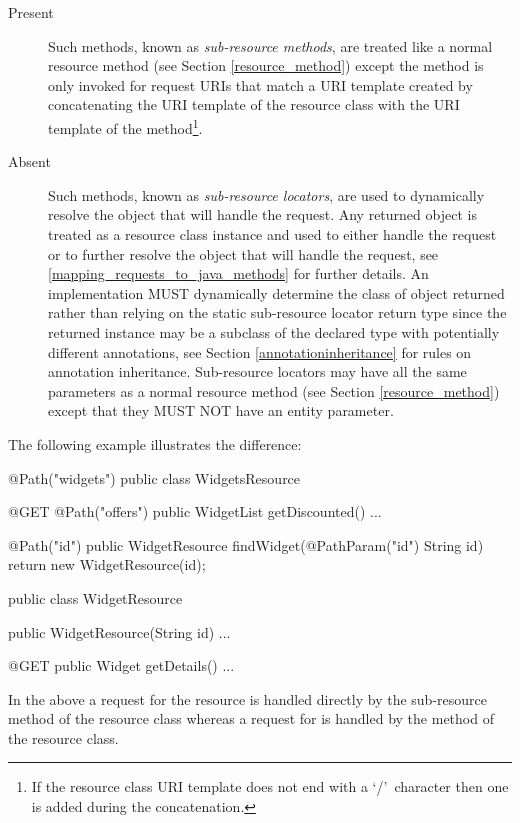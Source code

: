 \begin{description}
\item[Present] Such methods, known as {\em sub-resource methods}, are treated like a normal resource method (see Section \ref{resource_method}) except the method is only invoked for request URIs that match a URI template created by concatenating the URI template of the resource class with the URI template of the method\footnote{If the resource class URI template does not end with a \lq/\rq\ character then one is added during the concatenation.}.
\item[Absent] Such methods, known as {\em sub-resource locators}, are used to dynamically resolve the object that will handle the request. Any returned object is treated as a resource class instance and used to either handle the request or to further resolve the object that will handle the request, see \ref{mapping_requests_to_java_methods} for further details. An implementation MUST dynamically determine the class of object returned rather than relying on the static sub-resource locator return type since the returned instance may be a subclass of the declared type with potentially different annotations, see Section \ref{annotationinheritance} for rules on annotation inheritance. Sub-resource locators may have all the same parameters as a normal resource method (see Section \ref{resource_method}) except that they MUST NOT have an entity parameter. 
\end{description}

The following example illustrates the difference:

\begin{listing}{1}
@Path("widgets")
public class WidgetsResource {
  @GET
  @Path("offers")
  public WidgetList getDiscounted() {...}
  
  @Path("{id}")
  public WidgetResource findWidget(@PathParam("id") String id) {
    return new WidgetResource(id);
  }
}

public class WidgetResource {
  public WidgetResource(String id) {...}

  @GET
  public Widget getDetails() {...}
}\end{listing}

In the above a  request for the  resource is handled directly by the  sub-resource method of the resource class  whereas a  request for  is handled by the  method of the  resource class.

